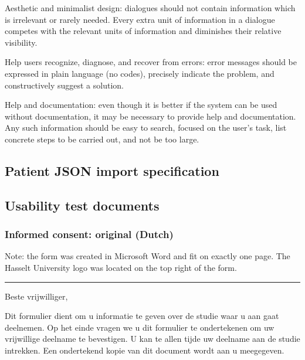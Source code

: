 \begin{nielsenenumerate}
        \item Aesthetic and minimalist design: dialogues should not contain information which is irrelevant or rarely needed. Every extra unit of information in a dialogue competes with the relevant units of information and diminishes their relative visibility.
        \item Help users recognize, diagnose, and recover from errors: error messages should be expressed in plain language (no codes), precisely indicate the problem, and constructively suggest a solution.
        \item Help and documentation: even though it is better if the system can be used without documentation, it may be necessary to provide help and documentation. Any such information should be easy to search, focused on the user's task, list concrete steps to be carried out, and not be too large.
    \end{nielsenenumerate}

\newpage
\subsection{Patient JSON import specification}\label{json_import}

\newpage
\subsection{Usability test documents}\label{appendix_test_docs}

    \subsubsection{Informed consent: original (Dutch)}\label{appendix_test_consent}

    Note: the form was created in Microsoft Word and fit on exactly one page. The Hasselt University logo was located on the top right of the form.
    
    \vspace{6pt}
    \hrule
    \vspace{6pt}
    \noindent Beste vrijwilliger,\bigskip
    
    \noindent Dit formulier dient om u informatie te geven over de studie waar u aan gaat deelnemen. Op het einde vragen we u dit formulier te ondertekenen om uw vrijwillige deelname te bevestigen. U kan te allen tijde uw deelname aan de studie intrekken. Een ondertekend kopie van dit document wordt aan u meegegeven.\bigskip
    
